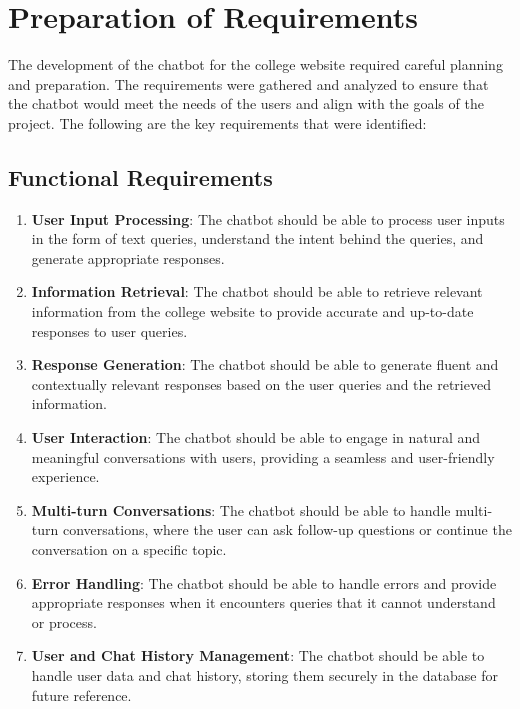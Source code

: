 \section{Preparation of Requirements}
The development of the chatbot for the college website required careful planning and preparation. The requirements were gathered and analyzed to ensure that the chatbot would meet the needs of the users and align with the goals of the project. The following are the key requirements that were identified:
\subsection{Functional Requirements}
\begin{enumerate}
  \item \textbf{User Input Processing}: The chatbot should be able to process user inputs in the form of text queries, understand the intent behind the queries, and generate appropriate responses.
  \item \textbf{Information Retrieval}: The chatbot should be able to retrieve relevant information from the college website to provide accurate and up-to-date responses to user queries.
  \item \textbf{Response Generation}: The chatbot should be able to generate fluent and contextually relevant responses based on the user queries and the retrieved information.
  \item \textbf{User Interaction}: The chatbot should be able to engage in natural and meaningful conversations with users, providing a seamless and user-friendly experience.
  \item \textbf{Multi-turn Conversations}: The chatbot should be able to handle multi-turn conversations, where the user can ask follow-up questions or continue the conversation on a specific topic.
  \item \textbf{Error Handling}: The chatbot should be able to handle errors and provide appropriate responses when it encounters queries that it cannot understand or process.
  \item \textbf{User and Chat History Management}: The chatbot should be able to handle user data and chat history, storing them securely in the database for future reference.
\end{enumerate}
